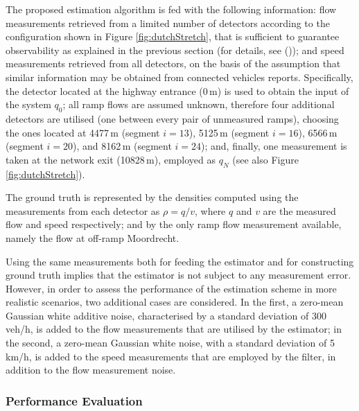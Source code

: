 \documentclass[titlepage,oneside,fleqn,12pt]{article}
\newcommand{\trbcite}[1]{\citeauthor{#1} ({\it \citenum{#1}})}
\begin{document}
The proposed estimation algorithm is fed with the following information: flow measurements retrieved from a limited number of detectors according to the configuration shown in Figure \ref{fig:dutchStretch}, that is sufficient to guarantee observability as explained in the previous section (for details, see \trbcite{Bekiaris2015}); and speed measurements retrieved from all detectors, on the basis of the assumption that similar information may be obtained from connected vehicles reports. Specifically, the detector located at the highway entrance (0\,m) is used to obtain the input of the system $q_0$; all ramp flows are assumed unknown, therefore four additional detectors are utilised (one between every pair of unmeasured ramps), choosing the ones located at 4477\,m (segment $i=13$), 5125\,m (segment $i=16$), 6566\,m (segment $i=20$), and 8162\,m (segment $i=24$); and, finally, one measurement is taken at the network exit (10828\,m), employed as $q_N$ (see also Figure \ref{fig:dutchStretch}).

The ground truth is represented by the densities computed using the measurements from each detector as $\rho = q/v$, where $q$ and $v$ are the measured flow and speed respectively; and by the only ramp flow measurement available, namely the flow at off-ramp Moordrecht.

Using the same measurements both for feeding the estimator and for constructing ground truth implies that the estimator is not subject to any measurement error. However, in order to assess the performance of the estimation scheme in more realistic scenarios, two additional cases are considered. In the first, a zero-mean Gaussian white additive noise, characterised by a standard deviation of 300\,veh/h, is added to the flow measurements that are utilised by the estimator; in the second, a zero-mean Gaussian white noise, with a standard deviation of 5\,km/h, is added to the speed measurements that are employed by the filter, in addition to the flow measurement noise.

\subsubsection{Performance Evaluation}
\end{document}
